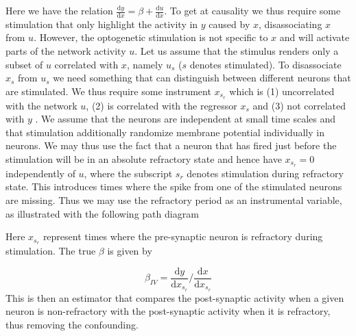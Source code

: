 \documentclass[11pt]{article}
\newcommand{\de}[2]{\frac{\mathrm{d} #1}{\mathrm{d} #2}}
\begin{document}
\begin{center}
\end{center}
Here we have the relation $ \de{y}{x} = \beta + \de{u}{x} $. To get at causality we thus require some stimulation that only highlight the activity in $ y $ caused by $ x $, disassociating $x$ from $u$. However, the optogenetic stimulation is not specific to $x$ and will activate parts of the network activity $ u $. Let us assume that the stimulus renders only a subset of $u$ correlated with $x$, namely $u_s$ ($s$ denotes stimulated). To disassociate $x_s$ from $u_s$ we need something that can distinguish between different neurons that are stimulated. We thus require some instrument $ x_{s_r} $ which is (1) uncorrelated with the network $ u $, (2) is correlated with the regressor $ x_s $ and (3) not correlated with $ y $ \citep{angrist2008mostly}. We assume that the neurons are independent at small time scales and that stimulation additionally randomize membrane potential individually in neurons. We may thus use the fact that a neuron that has fired just before the stimulation will be in an absolute refractory state and hence have $ x_{s_r}=0 $ independently of $ u $, where the subscript $ s_r $ denotes stimulation during refractory state. This introduces times where the spike from one of the stimulated neurons are missing. Thus we may use the refractory period as an instrumental variable, as illustrated with the following path diagram

\begin{center}
\end{center}
Here $ x_{s_r} $ represent times where the pre-synaptic neuron is refractory during stimulation. The true $ \beta $ is given by \citep{wright1928tariff}

\begin{equation}
\beta_{IV} = \de{y}{x_{s_r}} / \de{x}{x_{s_r}}
\end{equation}
This is then an estimator that compares the post-synaptic activity when a given neuron is non-refractory with the post-synaptic activity when it is refractory, thus removing the confounding.
\end{document}

